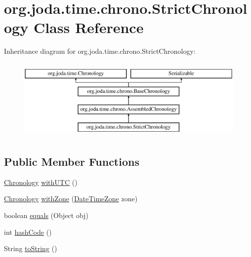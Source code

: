 \hypertarget{classorg_1_1joda_1_1time_1_1chrono_1_1_strict_chronology}{\section{org.\-joda.\-time.\-chrono.\-Strict\-Chronology Class Reference}
\label{classorg_1_1joda_1_1time_1_1chrono_1_1_strict_chronology}
}
Inheritance diagram for org.\-joda.\-time.\-chrono.\-Strict\-Chronology\-:\begin{figure}[H]
\begin{center}
\leavevmode
\includegraphics[height=4.000000cm]{classorg_1_1joda_1_1time_1_1chrono_1_1_strict_chronology}
\end{center}
\end{figure}
\subsection*{Public Member Functions}
\begin{DoxyCompactItemize}
\item 
\hyperlink{classorg_1_1joda_1_1time_1_1_chronology}{Chronology} \hyperlink{classorg_1_1joda_1_1time_1_1chrono_1_1_strict_chronology_a9d34bea65c16f0dc53c82a0e3e582a3b}{with\-U\-T\-C} ()
\item 
\hyperlink{classorg_1_1joda_1_1time_1_1_chronology}{Chronology} \hyperlink{classorg_1_1joda_1_1time_1_1chrono_1_1_strict_chronology_a793db42513ea32a4e856735e6a39da61}{with\-Zone} (\hyperlink{classorg_1_1joda_1_1time_1_1_date_time_zone}{Date\-Time\-Zone} zone)
\item 
boolean \hyperlink{classorg_1_1joda_1_1time_1_1chrono_1_1_strict_chronology_a614e78290cba9d3a87c78b43ed575a74}{equals} (Object obj)
\item 
int \hyperlink{classorg_1_1joda_1_1time_1_1chrono_1_1_strict_chronology_a91851a66ea27468fe61f6eb383f56147}{hash\-Code} ()
\item 
String \hyperlink{classorg_1_1joda_1_1time_1_1chrono_1_1_strict_chronology_aa91c71548e289938cbc87e6437be6a86}{to\-String} ()
\end{DoxyCompactItemize}
